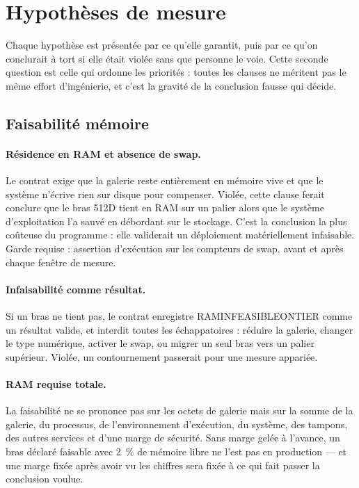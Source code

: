 \documentclass[11pt,a4paper]{article}
\newcommand{\brkunder}{\textunderscore\allowbreak}
\newcommand{\cle}[1]{{\ttfamily\let\_\brkunder #1}}
\begin{document}
\section{Hypothèses de mesure}\label{sec:mesure}

Chaque hypothèse est présentée par ce qu'elle garantit, puis par ce qu'on conclurait
à tort si elle était violée sans que personne le voie. Cette seconde question est
celle qui ordonne les priorités : toutes les clauses ne méritent pas le même effort
d'ingénierie, et c'est la gravité de la conclusion fausse qui décide.

\subsection{Faisabilité mémoire}

\paragraph{Résidence en RAM et absence de swap.} Le contrat exige que la galerie
reste entièrement en mémoire vive et que le système n'écrive rien sur disque pour
compenser. Violée, cette clause ferait conclure que le bras 512D tient en RAM sur un
palier alors que le système d'exploitation l'a sauvé en débordant sur le stockage.
C'est la conclusion la plus coûteuse du programme : elle validerait un déploiement
matériellement infaisable. Garde requise : assertion d'exécution sur les compteurs de
swap, avant et après chaque fenêtre de mesure.

\paragraph{Infaisabilité comme résultat.} Si un bras ne tient pas, le contrat
enregistre \cle{RAM\_INFEASIBLE\_ON\_TIER} comme un résultat valide, et interdit
toutes les échappatoires : réduire la galerie, changer le type numérique, activer le
swap, ou migrer un seul bras vers un palier supérieur. Violée, un contournement
passerait pour une mesure appariée.

\paragraph{RAM requise totale.} La faisabilité ne se prononce pas sur les octets de
galerie mais sur la somme de la galerie, du processus, de l'environnement
d'exécution, du système, des tampons, des autres services et d'une marge de
sécurité. Sans marge gelée à l'avance, un bras déclaré faisable avec \SI{2}{\percent}
de mémoire libre ne l'est pas en production — et une marge fixée après avoir vu les
chiffres sera fixée à ce qui fait passer la conclusion voulue.
\end{document}
